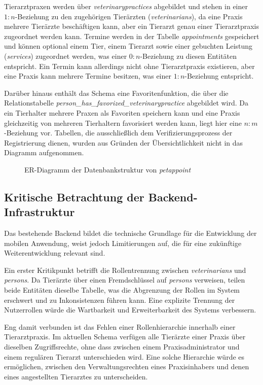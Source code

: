 Tierarztpraxen werden über \textit{veterinarypractices} abgebildet und stehen in einer $1{:}n$-Beziehung zu den zugehörigen Tierärzten 
(\textit{veterinarians}), da eine Praxis mehrere Tierärzte beschäftigen kann, aber ein Tierarzt genau einer Tierarztpraxis zugeordnet werden kann. Termine werden in der Tabelle \textit{appointments} gespeichert und können optional einem Tier, einem Tierarzt sowie einer gebuchten Leistung (\textit{services}) zugeordnet werden, was einer 
$0{:}n$-Beziehung zu diesen Entitäten entspricht. Ein Termin kann allerdings nicht ohne Tierarztpraxis existieren, aber eine Praxis kann mehrere Termine besitzen, was einer $1{:}n$-Beziehung entspricht.

Darüber hinaus enthält das Schema eine Favoritenfunktion, die über die 
Relationstabelle \textit{person\_has\_favorized\_veterinarypractice} abgebildet wird. Da ein Tierhalter mehrere Praxen als Favoriten speichern kann und eine Praxis gleichzeitig von mehreren Tierhaltern favorisiert werden kann, liegt hier eine $n{:}m$-Beziehung vor. Tabellen, die ausschließlich dem Verifizierungsprozess der Registrierung dienen, wurden aus Gründen der Übersichtlichkeit nicht in das Diagramm aufgenommen.

\begin{figure}[H]
    \centering
    
    \caption{ER-Diagramm der Datenbankstruktur von \textit{petappoint}}
    \label{fig:erdiagramm}
\end{figure}

\subsection{Kritische Betrachtung der Backend-Infrastruktur}
\label{sec:backend-kritik}
Das bestehende Backend bildet die technische Grundlage für die Entwicklung der mobilen Anwendung, weist jedoch Limitierungen auf, die für eine zukünftige Weiterentwicklung relevant sind.

Ein erster Kritikpunkt betrifft die Rollentrennung zwischen 
\textit{veterinarians} und \textit{persons}. Da Tierärzte über einen Fremdschlüssel auf \textit{persons} verweisen, teilen beide Entitäten dieselbe Tabelle, was die Abgrenzung der Rollen im System erschwert und zu Inkonsistenzen führen kann. Eine explizite Trennung der Nutzerrollen würde die Wartbarkeit und Erweiterbarkeit des Systems verbessern.

Eng damit verbunden ist das Fehlen einer Rollenhierarchie innerhalb einer Tierarztpraxis. Im aktuellen Schema verfügen alle Tierärzte einer Praxis über dieselben Zugriffsrechte, ohne dass zwischen einem Praxisadministrator und einem regulären Tierarzt unterschieden wird. Eine solche Hierarchie würde es ermöglichen, zwischen den Verwaltungsrechten eines Praxisinhabers und denen eines angestellten Tierarztes zu unterscheiden.


